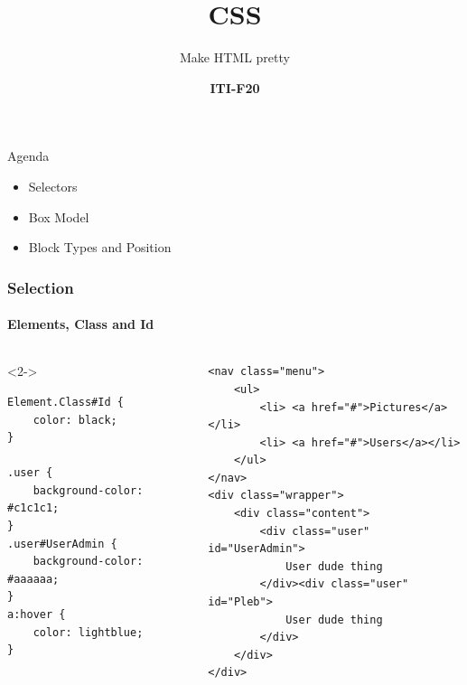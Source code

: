 \documentclass[aspectratio=169,10pt,t]{beamer}
\title{CSS}
\subtitle{Make HTML pretty}
\date{ }
\author{
  \textbf{ITI-F20}
}
\institute[
  SDU Robotics\\
  The Maersk Mc-Kinney Moller Institute\\
  University of Southern Denmark
] %
{%
  SDU Robotics\\
  The Maersk Mc-Kinney Moller Institute\\
  University of Southern Denmark

}
\begin{document}
{\SDUwavesbg%
\begin{frame} %
  \titlepage
\end{frame}}

\begin{frame}{Agenda}{\vphantom{(y}}
	\vfill
	\begin{itemize}
		\item Selectors
		\item Box Model
		\item Block Types and Position
	\end{itemize}
	\vfill
\end{frame}




\begin{frame}[fragile]
	\frametitle{Selection}
	\framesubtitle{Elements, Class and Id}
	\vspace{-0.8cm}
	\begin{columns}
		\begin{column}{0.4\textwidth}
			\begin{uncoverenv}<2->

				\begin{verbatim}
Element.Class#Id {
	color: black;
}

.user {
	background-color: #c1c1c1;
}
.user#UserAdmin {
	background-color: #aaaaaa;
}
a:hover {
	color: lightblue;
}

				\end{verbatim}

			\end{uncoverenv}

		\end{column}
		\begin{column}{0.6\textwidth}
\begin{verbatim}
<nav class="menu">
	<ul>
		<li> <a href="#">Pictures</a></li>
		<li> <a href="#">Users</a></li>
	</ul>
</nav>
<div class="wrapper">
	<div class="content">
		<div class="user" id="UserAdmin">
			User dude thing
		</div><div class="user" id="Pleb">
			User dude thing
		</div>
	</div>
</div>
\end{verbatim}

		\end{column}
	\end{columns}
\end{frame}
\end{document}
